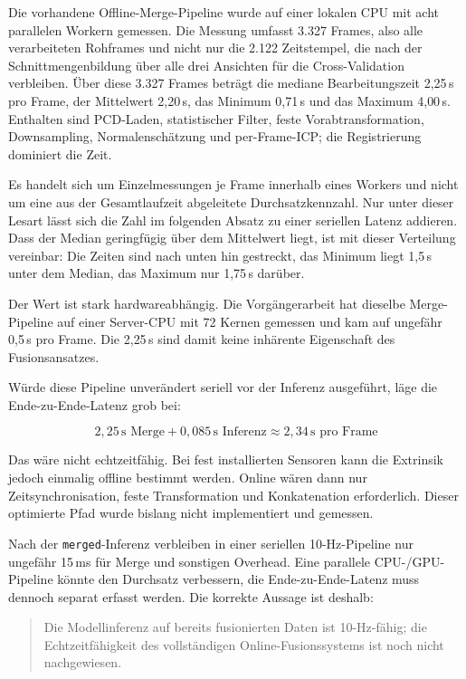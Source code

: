 Die vorhandene Offline-Merge-Pipeline wurde auf einer lokalen CPU mit acht parallelen Workern gemessen. Die Messung umfasst 3.327 Frames, also alle verarbeiteten Rohframes und nicht nur die 2.122 Zeitstempel, die nach der Schnittmengenbildung über alle drei Ansichten für die Cross-Validation verbleiben. Über diese 3.327 Frames beträgt die mediane Bearbeitungszeit 2{,}25\,s pro Frame, der Mittelwert 2{,}20\,s, das Minimum 0{,}71\,s und das Maximum 4{,}00\,s. Enthalten sind PCD-Laden, statistischer Filter, feste Vorabtransformation, Downsampling, Normalenschätzung und per-Frame-ICP; die Registrierung dominiert die Zeit.

Es handelt sich um Einzelmessungen je Frame innerhalb eines Workers und nicht um eine aus der Gesamtlaufzeit abgeleitete Durchsatzkennzahl. Nur unter dieser Lesart lässt sich die Zahl im folgenden Absatz zu einer seriellen Latenz addieren. Dass der Median geringfügig über dem Mittelwert liegt, ist mit dieser Verteilung vereinbar: Die Zeiten sind nach unten hin gestreckt, das Minimum liegt 1{,}5\,s unter dem Median, das Maximum nur 1{,}75\,s darüber.

Der Wert ist stark hardwareabhängig. Die Vorgängerarbeit \cite{pagel2025railway} hat dieselbe Merge-Pipeline auf einer Server-CPU mit 72 Kernen gemessen und kam auf ungefähr 0{,}5\,s pro Frame. Die 2{,}25\,s sind damit keine inhärente Eigenschaft des Fusionsansatzes.

Würde diese Pipeline unverändert seriell vor der Inferenz ausgeführt, läge die Ende-zu-Ende-Latenz grob bei:

\begin{equation*}
    2{,}25\,\text{s Merge} + 0{,}085\,\text{s Inferenz} \approx 2{,}34\,\text{s pro Frame}
\end{equation*}

Das wäre nicht echtzeitfähig. Bei fest installierten Sensoren kann die Extrinsik jedoch einmalig offline bestimmt werden. Online wären dann nur Zeitsynchronisation, feste Transformation und Konkatenation erforderlich. Dieser optimierte Pfad wurde bislang nicht implementiert und gemessen.

Nach der \texttt{merged}-Inferenz verbleiben in einer seriellen 10-Hz-Pipeline nur ungefähr 15\,ms für Merge und sonstigen Overhead. Eine parallele CPU-/GPU-Pipeline könnte den Durchsatz verbessern, die Ende-zu-Ende-Latenz muss dennoch separat erfasst werden. Die korrekte Aussage ist deshalb:

\begin{quote}
    Die Modellinferenz auf bereits fusionierten Daten ist 10-Hz-fähig; die Echtzeitfähigkeit des vollständigen Online-Fusionssystems ist noch nicht nachgewiesen.
\end{quote}
